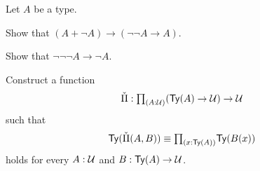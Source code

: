 \begin{exercises}
\item Let $A$ be a type.
  \begin{subexenum}
  \item Show that $(A+\neg A)\to(\neg\neg A\to A)$.
  \item Show that $\neg\neg\neg A \to \neg A$.
  \end{subexenum}
\item Construct a function
  \begin{equation*}
    \check{\Pi}:\prd{A:\UU} (\mathsf{Ty}(A)\to\UU)\to \UU
  \end{equation*}
  such that
  \begin{equation*}
    \mathsf{Ty}(\check{\Pi}(A,B))\jdeq \prd{x:\mathsf{Ty}(A)}\mathsf{Ty}(B(x))
  \end{equation*}
  holds for every $A:\mathcal{U}$ and $B:\mathsf{Ty}(A)\to\mathcal{U}$. 
  

\end{exercises}

